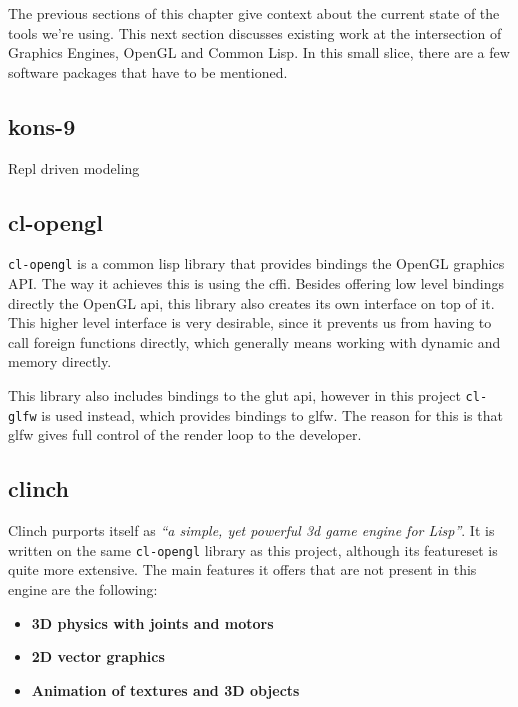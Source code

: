The previous sections of this chapter give context about the current state of the tools we're using.
This next section discusses existing work at the intersection of Graphics Engines, OpenGL and Common Lisp.
In this small slice,
there are a few software packages that have to be mentioned.


\subsection{kons-9}

Repl driven modeling

\subsection{cl-opengl}

\texttt{cl-opengl} is a common lisp library that provides bindings the OpenGL graphics API.
The way it achieves this is using the \ac{cffi}.
Besides offering low level bindings directly the OpenGL \ac{api},
this library also creates its own interface on top of it.
This higher level interface is very desirable,
since it prevents us from having to call foreign functions directly,
which generally means working with dynamic and memory directly\cite{cffi}.

This library also includes bindings to the \ac{glut} \ac{api},
however in this project \texttt{cl-glfw} is used instead,
which provides bindings to \ac{glfw}.
The reason for this is that \ac{glfw} gives full control of the render loop to the developer.

\subsection{clinch}

Clinch purports itself as \textit{``a simple, yet powerful 3d game engine for Lisp''}. It is written on the same \texttt{cl-opengl} library as this project, although its feature\-set is quite more extensive. The main features it offers that are not present in this engine are the following\cite{clinch}:

\begin{itemize}
\item \textbf{3D physics with joints and motors}
\item \textbf{2D vector graphics}
\item \textbf{Animation of textures and 3D objects}
\end{itemize}

